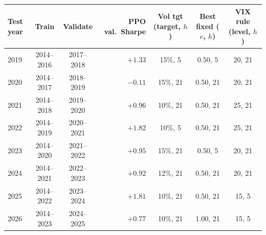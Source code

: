 \begin{tabular}{lccrccc}
\toprule
Test year & Train & Validate & PPO val.\ Sharpe & Vol tgt (target, $h$) & Best fixed ($e$, $h$) & VIX rule (level, $h$) \\
\midrule
2019 & 2014--2016 & 2017--2018 & $+1.33$ & 15\%, 5 & 0.50, 5 & 20, 21 \\
2020 & 2014--2017 & 2018--2019 & $-0.11$ & 15\%, 21 & 0.50, 21 & 20, 21 \\
2021 & 2014--2018 & 2019--2020 & $+0.96$ & 10\%, 21 & 0.50, 21 & 25, 21 \\
2022 & 2014--2019 & 2020--2021 & $+1.82$ & 10\%, 5 & 0.50, 21 & 25, 21 \\
2023 & 2014--2020 & 2021--2022 & $+0.95$ & 15\%, 21 & 0.50, 5 & 20, 21 \\
2024 & 2014--2021 & 2022--2023 & $+0.92$ & 12\%, 21 & 0.50, 21 & 20, 21 \\
2025 & 2014--2022 & 2023--2024 & $+1.81$ & 10\%, 21 & 0.50, 21 & 15, 5 \\
2026 & 2014--2023 & 2024--2025 & $+0.77$ & 10\%, 21 & 1.00, 21 & 15, 5 \\
\bottomrule
\end{tabular}
